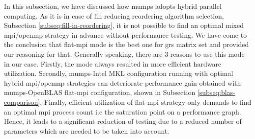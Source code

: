 In this subsection, we have discussed how \acrshort{mumps} adopts hybrid parallel computing. As it is in case of fill reducing reordering algorithm selection, Subsection \ref{subseq:fill-in-reordering}, it is not possible to find an optimal mixed \acrshort{mpi}/\acrshort{openmp} strategy in advance without performance testing. We have come to the conclusion that flat-\acrshort{mpi} mode is the best one for \acrshort{grs} matrix set and provided our reasoning for that. Generally speaking, there are 3 reasons to use this mode in our case. Firstly, the mode always resulted in more efficient hardware utilization. Secondly,  \acrshort{mumps}-Intel MKL configuration running with optimal hybrid \acrshort{mpi}/\acrshort{openmp} strategies can deteriorate performance gain obtained with \acrshort{mumps}-OpenBLAS flat-\acrshort{mpi} configuration, shown in Subsection \ref{subseq:blas-comparison}. Finally, efficient utilization of flat-\acrshort{mpi} strategy only demands to find an optimal \acrshort{mpi} process count i.e the saturation point on a performance graph. Hence, it leads to a significant reduction of testing due to a reduced number of parameters which are needed to be taken into account.\\
